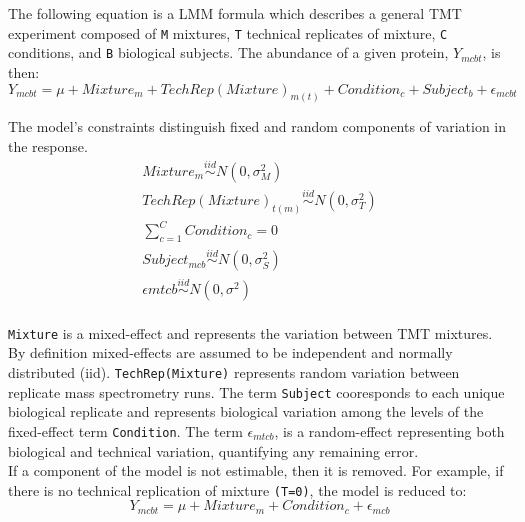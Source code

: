\documentclass[11pt]{elife}\usepackage[]{graphicx}\usepackage[]{color}
\begin{document}
The following equation is a LMM formula which describes a general TMT
experiment composed of \texttt{M} mixtures, \texttt{T} technical replicates of 
mixture, \texttt{C} conditions, and \texttt{B} biological subjects.
The abundance of a given protein, $Y_{mcbt}$, is then:\\

\begin{equation}
	Y_{mcbt} = \mu + Mixture_m + TechRep(Mixture)_{m(t)} + Condition_c + 
	Subject_b + \epsilon_{mcbt}
\end{equation}

The model's constraints distinguish fixed and random components of 
variation in the response.\\

\begin{equation}
  \begin{gathered}
	Mixture_m \stackrel{iid}{\sim} N(0,\sigma^2_M) \\
	TechRep(Mixture)_{t(m)} \stackrel{iid}{\sim} N(0,\sigma^2_T) \\
	\sum_{c=1}^{C} Condition_c = 0 \\
	Subject_{mcb} \stackrel{iid}{\sim} N(0,\sigma^2_S) \\
	\epsilon{mtcb} \stackrel{iid}{\sim} N(0,\sigma^2) \\
  \end{gathered}
\end{equation}

\texttt{Mixture} is a mixed-effect and represents the variation between TMT
mixtures. By definition mixed-effects are assumed to be independent and normally
distributed (iid).  \texttt{TechRep(Mixture)} represents random variation
between replicate mass spectrometry runs.  The term \texttt{Subject} cooresponds
to each unique biological replicate and represents biological variation among
the levels of the fixed-effect term \texttt{Condition}. The term
$\epsilon_{mtcb}$, is a random-effect representing both biological and technical
variation, quantifying any remaining error.\\

If a component of the model is not estimable, then it is removed. 
For example, if there is no technical replication of mixture 
\texttt{(T=0)}, the model is reduced to: \\

\begin{equation} 
	Y_{mcbt} = \mu + Mixture_m + Condition_c + \epsilon_{mcb}
\end{equation}
\end{document}

